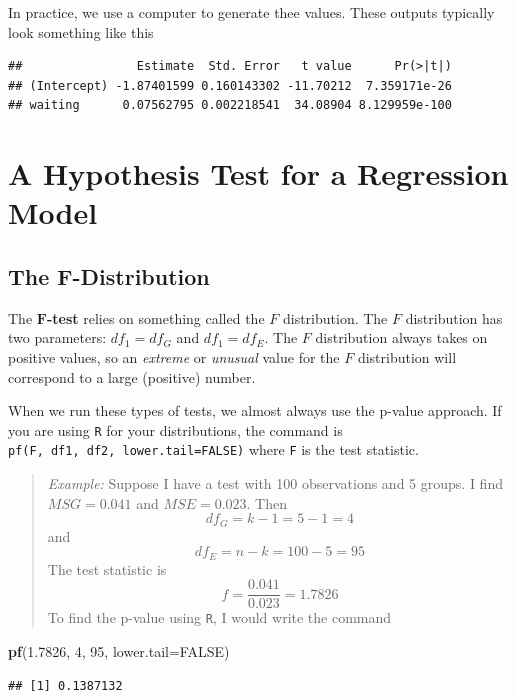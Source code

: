 \documentclass[
]{book}
\newenvironment{Shaded}{\begin{snugshade}}{\end{snugshade}}
\newcommand{\AttributeTok}[1]{\textcolor[rgb]{0.13,0.29,0.53}{#1}}
\newcommand{\ConstantTok}[1]{\textcolor[rgb]{0.56,0.35,0.01}{#1}}
\newcommand{\DecValTok}[1]{\textcolor[rgb]{0.00,0.00,0.81}{#1}}
\newcommand{\FloatTok}[1]{\textcolor[rgb]{0.00,0.00,0.81}{#1}}
\newcommand{\FunctionTok}[1]{\textcolor[rgb]{0.13,0.29,0.53}{\textbf{#1}}}
\newcommand{\NormalTok}[1]{#1}
\begin{document}
In practice, we use a computer to generate thee values. These outputs typically look something like this

\begin{verbatim}
##                Estimate  Std. Error   t value      Pr(>|t|)
## (Intercept) -1.87401599 0.160143302 -11.70212  7.359171e-26
## waiting      0.07562795 0.002218541  34.08904 8.129959e-100
\end{verbatim}

\section{A Hypothesis Test for a Regression Model}\label{a-hypothesis-test-for-a-regression-model}

\subsection{The F-Distribution}\label{the-f-distribution}

The \(\boldsymbol{F}\)\textbf{-test} relies on something called the \(F\) distribution. The \(F\) distribution has two parameters: \(df_1=df_G\) and \(df_1=df_E\). The \(F\) distribution always takes on positive values, so an \emph{extreme} or \emph{unusual} value for the \(F\) distribution will correspond to a large (positive) number.

When we run these types of tests, we almost always use the p-value approach. If you are using \texttt{R} for your distributions, the command is \texttt{pf(F,\ df1,\ df2,\ lower.tail=FALSE)} where \texttt{F} is the test statistic.

\begin{quote}
\emph{Example:} Suppose I have a test with 100 observations and 5 groups. I find \(MSG = 0.041\) and \(MSE = 0.023\). Then \[df_G = k-1 = 5-1 = 4\] and \[df_E = n-k = 100-5 = 95\] The test statistic is \[f = \frac{0.041}{0.023} = 1.7826\] To find the p-value using \texttt{R}, I would write the command
\end{quote}

\begin{Shaded}
\begin{Highlighting}[]
\FunctionTok{pf}\NormalTok{(}\FloatTok{1.7826}\NormalTok{, }\DecValTok{4}\NormalTok{, }\DecValTok{95}\NormalTok{, }\AttributeTok{lower.tail=}\ConstantTok{FALSE}\NormalTok{)}
\end{Highlighting}
\end{Shaded}

\begin{verbatim}
## [1] 0.1387132
\end{verbatim}
\end{document}
